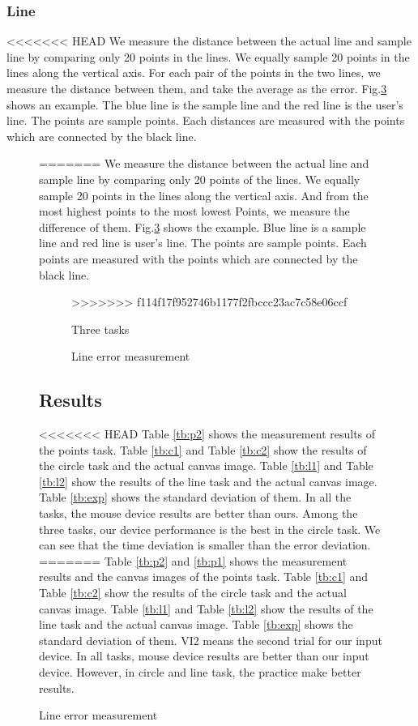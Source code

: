 \subsubsection{Line}
<<<<<<< HEAD
We measure the distance between the actual line and sample line by comparing only 20 points in the lines. We equally sample 20 points in the lines along the vertical axis. For each pair of the points in the two lines, we measure the distance between them, and take the average as the error. 
Fig.\ref{linem} shows an example. The blue line is the sample line and the red line is the user's line. The points are sample points. Each distances are measured with the points which are connected by the black line.
\begin{figure}
=======
We measure the distance between the actual line and sample line by comparing only 20 points of the lines. We equally sample 20 points in the lines along the vertical axis. And from the most highest points to the most lowest Points, we measure the difference of them.
Fig.\ref{linem} shows the example. Blue line is a sample line and red line is user's line. The points are sample points. Each points are measured with the points which are connected by the black line.
\begin{figure}[htbp]
>>>>>>> f114f17f952746b1177f2fbccc23ac7c58e06ccf

 \caption{Three tasks}
 \label{task}
\end{figure}

\begin{figure}[htbp]
 \centering
 
 \caption{Line error measurement}
 \label{linem}
\end{figure}


\subsection{Results}
<<<<<<< HEAD
Table \ref{tb:p2} shows the measurement results of the points task. Table \ref{tb:c1} and Table \ref{tb:c2} show the results of the circle task and the actual canvas image. Table \ref{tb:l1} and Table \ref{tb:l2} show the results of the line task and the actual canvas image. Table \ref{tb:exp} shows the standard deviation of them. In all the tasks, the mouse device results are better than ours. Among the three tasks, our device performance is the best in the circle task. We can see that the time deviation is smaller than the error deviation.
=======
Table \ref{tb:p2} and \ref{tb:p1} shows the measurement results and the canvas images of the points task. Table \ref{tb:c1} and Table \ref{tb:c2} show the results of the circle task and the actual canvas image. Table \ref{tb:l1} and Table \ref{tb:l2} show the results of the line task and the actual canvas image. Table \ref{tb:exp} shows the standard deviation of them. 
VI2 means the second trial for our input device. 
In all tasks, mouse device results are better than our input device. 
However, in circle and line task, the practice make better results.


\end{figure}

